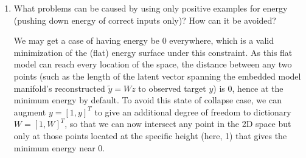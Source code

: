 \documentclass{article}
\begin{document}
\begin{enumerate}
	\item What problems can be caused by using only positive examples for
	      energy (pushing down energy of correct inputs only)? How can it
	      be avoided?
	      \begin{tcolorbox}
		      We may get a case of having energy be 0 everywhere,
		      which is a valid minimization of the (flat) energy
		      surface under this constraint. As this flat model can
		      reach every location of
		      the space, the distance between any two points (such as
		      the length of the
		      latent vector spanning the embedded model manifold's
		      reconstructed
		      $\tilde{y}=Wz$ to observed target $y$) is 0, hence at
		      the minimum energy by default. To avoid this state of
		      collapse
		      case, we can augment $y
			      = [1, y]^{T}$ to give an additional degree of
		      freedom to dictionary $W=[1, W]^{T}$, so
		      that we can now intersect any point in the 2D space but
		      only at those points
		      located at the specific height (here, 1) that gives the
		      minimum energy near 0.


\end{tcolorbox}
\end{enumerate}
\end{document}
